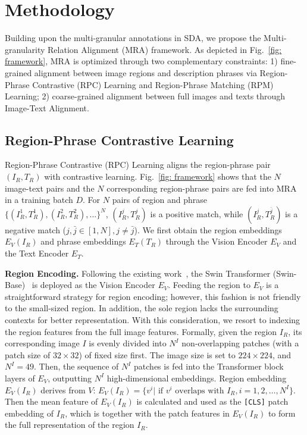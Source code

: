 \section{Methodology}
\label{method}
\noindent Building upon the multi-granular annotations in SDA, we propose the Multi-granularity Relation Alignment (MRA) framework. 
As depicted in Fig.~\ref{fig: framework}, MRA is optimized through two complementary constraints:
1) fine-grained alignment between image regions and description phrases via Region-Phrase Contrastive (RPC) Learning and Region-Phrase Matching (RPM) Learning; 
2) coarse-grained alignment between full images and texts through Image-Text Alignment.




\subsection{Region-Phrase Contrastive Learning}
\noindent Region-Phrase Contrastive (RPC) Learning aligns the region-phrase pair $(I_R, T_R)$ with contrastive learning.
Fig.~\ref{fig: framework} shows that the $N$ image-text pairs and the $N$ corresponding region-phrase pairs are fed into MRA in a training batch $D$.
For $N$ pairs of region and phrase $\{(I_R^1, T_R^1), (I_R^2, T_R^2), ...\}^N$, $(I_R^j, T_R^j)$ is a positive match, while $(I_R^j, T_R^{\bar{j}})$ is a negative match ($j, \bar{j} \in [1, N], j \neq \bar{j}$). 
We first obtain the region embeddings $E_V(I_R)$ and phrase embeddings $E_T(T_R)$ through the Vision Encoder $E_V$ and the Text Encoder $E_T$.


\noindent\textbf{Region Encoding.}
Following the existing work~\cite{yang2023towards}, the Swin Transformer (Swin-Base)~\cite{liu2021swin} is deployed as the Vision Encoder $E_V$. Feeding the region to $E_V$ is a straightforward strategy for region encoding; however, this fashion is not friendly to the small-sized region. In addition, the sole region lacks the surrounding contexts for better representation. With this consideration, we resort to indexing the region features from the full image features. 
Formally, given the region $I_R$, its corresponding image $I$ is evenly divided into $N^I$ non-overlapping patches (with a patch size of $32 \times 32$) of fixed size first. 
The image size is set to $224 \times 224$, and $N^I = 49$.
Then, the sequence of $N^I$ patches is fed into the Transformer block layers of $E_V$, outputting $N^I$ high-dimensional embeddings.
Region embedding $E_V(I_R)$ derives from $V$: $E_V(I_R)= \{v^{i} | \text{ if } v^{i} \text{ overlaps with } I_R, i=1,2,\dots,N^I\}$.
Then the mean feature of $E_V(I_R)$ is calculated and used as the \texttt{[CLS]} patch embedding of $I_R$, which is together with the patch features in $E_V(I_R)$ to form the full representation of the region $I_R$.


